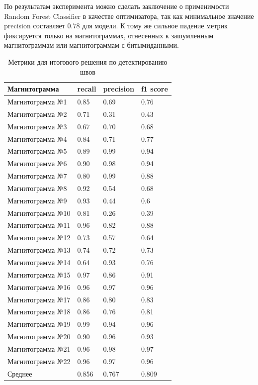 \documentclass[a4paper,article,14pt]{extarticle}
\begin{document}
По результатам эксперимента можно сделать заключение о применимости Random Forest Classifier в качестве 
оптимизатора, так как минимальное значение precision составляет 0.78 для модели. К тому же сильное 
падение метрик фиксируется только на магнитограммах, отнесенных к зашумленным магнитограммам или 
магнитограммам с \flqq битыми\frqq данными.

\begin{center}
    \begin{longtable}{|p{5cm}|p{3cm}|p{3cm}|p{3cm}|}
        \caption{Метрики для итогового решения по детектированию швов}\\\hline
        Магнитограмма & recall & precision & f1 score \\ \hline
        Магнитограмма №1 & 0.85 & 0.69 & 0.76 \\ \hline
        Магнитограмма №2 & 0.71 & 0.31 & 0.43 \\ \hline
        Магнитограмма №3 & 0.67 & 0.70 & 0.68 \\ \hline
        Магнитограмма №4 & 0.84 & 0.71 & 0.77 \\ \hline
        Магнитограмма №5 & 0.89 & 0.99 & 0.94 \\ \hline
        Магнитограмма №6 & 0.90 & 0.98 & 0.94 \\ \hline
        Магнитограмма №7 & 0.80 & 0.99 & 0.88 \\ \hline
        Магнитограмма №8 & 0.92 & 0.54 & 0.68 \\ \hline
        Магнитограмма №9 & 0.93 & 0.44 & 0.6 \\ \hline
        Магнитограмма №10 & 0.81 & 0.26 & 0.39 \\ \hline
        Магнитограмма №11 & 0.96 & 0.82 & 0.88 \\ \hline
        Магнитограмма №12 & 0.73 & 0.57 & 0.64 \\ \hline
        Магнитограмма №13 & 0.74 & 0.72 & 0.73 \\ \hline
        Магнитограмма №14 & 0.64 & 0.93 & 0.76 \\ \hline
        Магнитограмма №15 & 0.97 & 0.86 & 0.91 \\ \hline
        Магнитограмма №16 & 0.96 & 0.97 & 0.96 \\ \hline
        Магнитограмма №17 & 0.86 & 0.80 & 0.83 \\ \hline
        Магнитограмма №18 & 0.86 & 0.76 & 0.81 \\ \hline
        Магнитограмма №19 & 0.99 & 0.94 & 0.96 \\ \hline
        Магнитограмма №20 & 0.90 & 0.96 & 0.93 \\ \hline
        Магнитограмма №21 & 0.96 & 0.98 & 0.97 \\ \hline
        Магнитограмма №22 & 0.96 & 0.97 & 0.96 \\ \hline
        Среднее & 0.856 & 0.767 & 0.809 \\ \hline
    \end{longtable}
\end{center}
\end{document}
